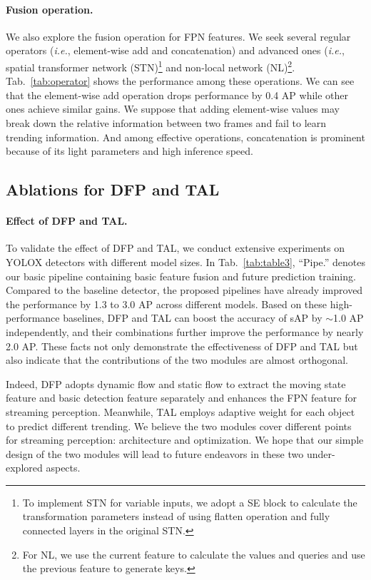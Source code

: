 \documentclass[10pt,twocolumn,letterpaper]{article}
\begin{document}
\paragraph{Fusion operation.} We also explore the fusion operation for FPN features. We seek several regular operators (\emph{i.e.}, element-wise add and concatenation) and advanced ones (\emph{i.e.}, spatial transformer network \cite{stn} (STN)\footnote{To implement STN for variable inputs, we adopt a SE \cite{senet} block to calculate the transformation parameters instead of using flatten operation and fully connected layers in the original STN.} and non-local network \cite{nonlocal} (NL)\footnote{For NL, we use the current feature to calculate the values and queries and use the previous feature to generate keys.}. Tab.~\ref{tab:operator} shows the performance among these operations. We can see that the element-wise add operation drops performance by 0.4 AP while other ones achieve similar gains. We suppose that adding element-wise values may break down the relative information between two frames and fail to learn trending information. And among effective operations, concatenation is prominent because of its light parameters and high inference speed.


\subsection{Ablations for DFP and TAL}

\paragraph{Effect of DFP and TAL.} To validate the effect of DFP and TAL, we conduct extensive experiments on YOLOX detectors with different model sizes. In Tab.~\ref{tab:table3}, ``Pipe.'' denotes our basic pipeline containing basic feature fusion and future prediction training. Compared to the baseline detector, the proposed pipelines have already improved the performance by 1.3 to 3.0 AP across different models. Based on these high-performance baselines, DFP and TAL can boost the accuracy of sAP by $\sim$1.0 AP independently, and their combinations further improve the performance by nearly 2.0 AP. These facts not only demonstrate the effectiveness of DFP and TAL but also indicate that the contributions of the two modules are almost orthogonal. 

Indeed, DFP adopts dynamic flow and static flow to extract the moving state feature and basic detection feature separately and enhances the FPN feature for streaming perception. Meanwhile, TAL employs adaptive weight for each object to predict different trending. We believe the two modules cover different points for streaming perception: architecture and optimization. We hope that our simple design of the two modules will lead to future endeavors in these two under-explored aspects.
\end{document}
